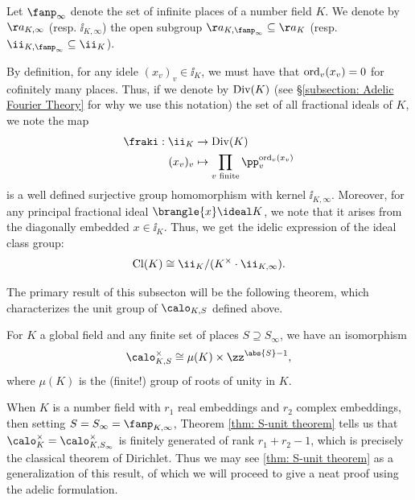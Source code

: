 \documentclass[11pt, x11names, openany]{book}
\begin{document}
\begin{example}
    \label{example: idelic form of Cl(K)}
Let $\fanp_\infty$ denote the set of infinite places of a number field $K$. We denote by $\aa_{K, \infty}$ (resp. $\ii_{K, \infty}$) the open subgroup $\aa_{K, \fanp_\infty} \subseteq \aa_K$ (resp. $\ii_{K, \fanp_\infty} \subseteq \ii_K$).

By definition, for any idele $(x_v)_v \in \ii_K$, we must have that $\operatorname{ord}_v(x_v) = 0$ for cofinitely many places. Thus, if we denote by $\operatorname{Div}(K)$ (see \S \ref{subsection: Adelic Fourier Theory} for why we use this notation) the set of all fractional ideals of $K$, we note the map
\begin{align*}
    \fraki: \ii_K &\to \Div(K)\\
    (x_v)_v & \mapsto \prod_{v \text{ finite}} \pp_v^{\ord_v(x_v)}
\end{align*}
is a well defined surjective group homomorphism with kernel $\ii_{K, \infty}$. Moreover, for any principal fractional ideal $\brangle{x} \ideal K$, we note that it arises from the diagonally embedded $x \in \ii_K$. Thus, we get the idelic expression of the ideal class group:
\begin{equation}
    \label{eqn: idelic form of Cl(K)}
    \cl(K) \cong \ii_K/(K^\times \cdot \ii_{K, \infty}).
\end{equation}

\end{example}

The primary result of this subsecton will be the following theorem, which characterizes the unit group of $\calo_{K, S}$ defined above.

\begin{theorem}
    \label{thm: S-unit theorem}
        For $K$ a global field and any finite set of places $S \supseteq S_\infty$, we have an isomorphism
        \begin{equation*}
            \calo_{K, S}^\times \cong \mu(K) \times \zz^{\abs{S} - 1},
        \end{equation*}
        where $\mu(K)$ is the (finite!) group of roots of unity in $K$.
\end{theorem}


\begin{example}
    \label{example: dirichlet's unit thm}
    When $K$ is a number field with $r_1$ real embeddings and $r_2$ complex embeddings, then setting $S = S_\infty = \fanp_{K, \infty}$,  Theorem \ref{thm: S-unit theorem} tells us that $\calo_K^\times = \calo_{K, S_\infty}^\times$ is finitely generated of rank $r_1 + r_2 - 1$, which is precisely the classical theorem of Dirichlet. Thus we may see \ref{thm: S-unit theorem} as a generalization of this result, of which we will proceed to give a neat proof using the adelic formulation.
\end{example}
\end{document}
